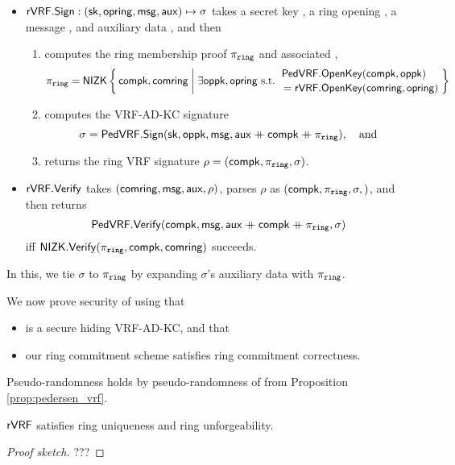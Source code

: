 \begin{itemize}
\item ${\mathsf{rVRF}}.{\mathsf{Sign}} : (\mathsf{sk},\mathsf{opring},\mathsf{msg},\mathsf{aux}) \mapsto \sigma$ takes
 a secret key \sk, a ring opening \openring, a message \msg, and auxiliary data \aux, and then \\
 \begin{enumerate}
 \item computes the ring membership proof $\pi_{\mathtt{ring}}$ and associated \openpk,
  $$ \piring = \NIZK \Setst{ \compk, \comring }{
  \exists \openpk,\openring \textrm{\ s.t.\ } 
  \genfrac{}{}{0pt}{}{\PedVRF.\OpenKey(\compk,\openpk) \quad}{\,\, = \rVRF.\OpenKey(\comring,\openring)}
  } $$
 \item computes the VRF-AD-KC signature
  $$ \sigma = {\mathsf{PedVRF}}.{\mathsf{Sign}}(\mathsf{sk},\mathsf{oppk},\mathsf{msg},\mathsf{aux} \mathbin{+\mkern-10mu+} \mathsf{compk} \mathbin{+\mkern-10mu+} \pi_{\mathtt{ring}}), \quad\textrm{and} $$ %
 \item returns the ring VRF signature $\rho = (\mathsf{compk},\pi_{\mathtt{ring}},\sigma)$.
 \end{enumerate}
\item ${\mathsf{rVRF}}.{\mathsf{Verify}}$ takes $(\mathsf{comring},\mathsf{msg},\mathsf{aux},\rho)$,
 parses $\rho$ as $(\mathsf{compk},\pi_{\mathtt{ring}},\sigma,)$,  and then returns
 $$ {\mathsf{PedVRF}}.{\mathsf{Verify}}(\mathsf{compk},\mathsf{msg},\mathsf{aux} \mathbin{+\mkern-10mu+} \mathsf{compk} \mathbin{+\mkern-10mu+} \pi_{\mathtt{ring}},\sigma) $$
 iff ${\mathsf{NIZK}}.{\mathsf{Verify}}(\pi_{\mathtt{ring}},\mathsf{compk},\mathsf{comring})$ succeeds. 
\end{itemize}

In this, we tie $\sigma$ to $\pi_{\mathtt{ring}}$ by expanding $\sigma$'s auxiliary data with $\pi_{\mathtt{ring}}$.

\smallskip

We now prove security of \rVRF using that
\begin{itemize}
\item \PedVRF is a secure hiding VRF-AD-KC, and that
\item our ring commitment scheme satisfies ring commitment correctness.
\end{itemize}

Pseudo-randomness holds by pseudo-randomness of \PedVRF from
 Proposition \ref{prop:pedersen_vrf}.

\begin{proposition}\label{prop:pedersen_rvrf}
${\mathsf{rVRF}}$ satisfies ring uniqueness and ring unforgeability.
\end{proposition}

\begin{proof}[Proof sketch]
???
\end{proof}



